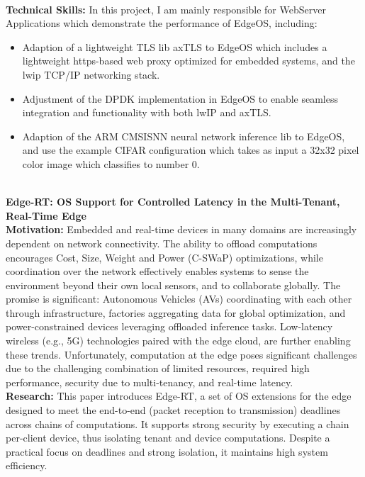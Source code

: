 \vspace{-1.0em}
\
\\
\textbf{\small Technical Skills:}
In this project, I am mainly responsible for WebServer Applications which demonstrate the performance of EdgeOS, including:
\begin{itemize}[leftmargin=*]
    \setlength\itemsep{-0.0em}
	\item Adaption of a lightweight TLS lib axTLS to EdgeOS which includes a lightweight https-based web proxy optimized for embedded systems, and the lwip TCP/IP networking stack.
	\item Adjustment of  the DPDK implementation in EdgeOS to enable seamless integration and functionality with both lwIP and axTLS.
	\item Adaption of the ARM CMSISNN neural network inference lib to EdgeOS, and use the example CIFAR\-10 configuration which takes as input a 32x32 pixel color image which classifies to number 0.
\end{itemize}
\vspace{-1.0em}
\
\\
\textbf{Edge-RT: OS Support for Controlled Latency in the Multi-Tenant, Real-Time Edge}
\\
\textbf{\small Motivation:}
Embedded and real-time devices in many domains are increasingly dependent on network connectivity.
The ability to offload computations encourages Cost, Size, Weight and Power (C-SWaP) optimizations, while coordination over the network effectively enables systems to sense the environment beyond their own local sensors, and to collaborate globally.
The promise is significant: Autonomous Vehicles (AVs) coordinating with each other through infrastructure, factories aggregating data for global optimization, and power-constrained devices leveraging offloaded inference tasks.
Low-latency wireless (e.g., 5G) technologies paired with the edge cloud, are further enabling these trends.
Unfortunately, computation at the edge poses significant challenges due to the challenging combination of limited resources, required high performance, security due to multi-tenancy, and real-time latency.
\\
\textbf{\small Research:}
This paper introduces Edge-RT, a set of OS extensions for the edge designed to meet the end-to-end (packet reception to transmission) deadlines across chains of computations.
It supports strong security by executing a chain per-client device, thus isolating tenant and device computations.
Despite a practical focus on deadlines and strong isolation, it maintains high system efficiency.
